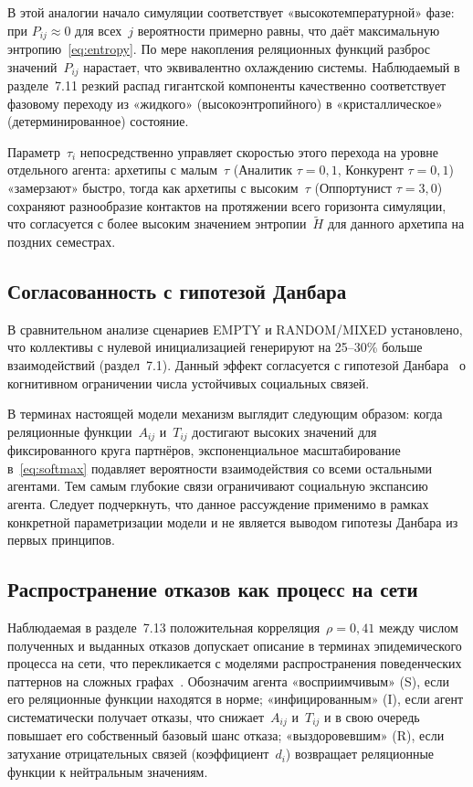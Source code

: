 \documentclass[12pt]{article}
\begin{document}
В этой аналогии начало симуляции соответствует «высокотемпературной»
фазе: при $P_{ij} \approx 0$ для всех~$j$ вероятности примерно
равны, что даёт максимальную энтропию~\eqref{eq:entropy}.
По мере накопления реляционных функций разброс значений~$P_{ij}$
нарастает, что эквивалентно охлаждению системы. Наблюдаемый в
разделе~7.11 резкий распад гигантской компоненты качественно
соответствует фазовому переходу из «жидкого» (высокоэнтропийного)
в «кристаллическое» (детерминированное) состояние.

Параметр~$\tau_i$ непосредственно управляет скоростью этого перехода
на уровне отдельного агента: архетипы с малым~$\tau$ (Аналитик
$\tau = 0{,}1$, Конкурент $\tau = 0{,}1$) «замерзают» быстро,
тогда как архетипы с высоким~$\tau$ (Оппортунист $\tau = 3{,}0$)
сохраняют разнообразие контактов на протяжении всего горизонта
симуляции, что согласуется с более высоким значением энтропии~$\tilde{H}$
для данного архетипа на поздних семестрах.

\subsection{Согласованность с гипотезой Данбара}

В сравнительном анализе сценариев EMPTY и RANDOM/MIXED установлено,
что коллективы с нулевой инициализацией генерируют на 25--30\%
больше взаимодействий (раздел~7.1).
Данный эффект согласуется с гипотезой Данбара~\cite{Dunbar1992}
о когнитивном ограничении числа устойчивых социальных связей.

В терминах настоящей модели механизм выглядит следующим образом:
когда реляционные функции~$A_{ij}$ и~$T_{ij}$ достигают высоких
значений для фиксированного круга партнёров, экспоненциальное
масштабирование в~\eqref{eq:softmax} подавляет вероятности
взаимодействия со всеми остальными агентами. Тем самым
глубокие связи ограничивают социальную экспансию агента.
Следует подчеркнуть, что данное рассуждение применимо в рамках
конкретной параметризации модели и не является выводом гипотезы
Данбара из первых принципов.

\subsection{Распространение отказов как процесс на сети}

Наблюдаемая в разделе~7.13 положительная корреляция~$\rho = 0{,}41$
между числом полученных и выданных отказов допускает описание
в терминах эпидемического процесса на сети, что перекликается с моделями распространения поведенческих паттернов на сложных графах~\cite{Centola2010}.
Обозначим агента «восприимчивым» (S), если его реляционные функции
находятся в норме; «инфицированным» (I), если агент систематически
получает отказы, что снижает~$A_{ij}$ и~$T_{ij}$ и в свою очередь
повышает его собственный базовый шанс отказа; «выздоровевшим»
(R), если затухание отрицательных связей (коэффициент~$d_i$)
возвращает реляционные функции к нейтральным значениям.
\end{document}
